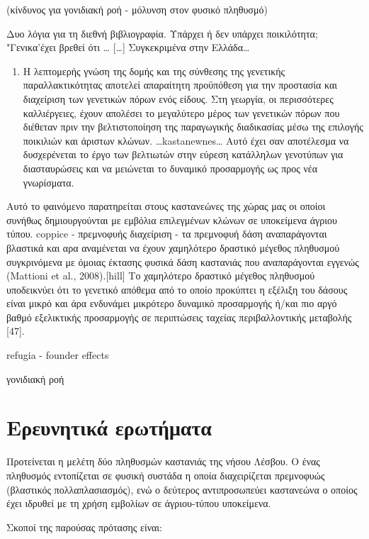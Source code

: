 \documentclass[12pt,a4paper,]{report}
\providecommand{\tightlist}{%
  \setlength{\itemsep}{0pt}\setlength{\parskip}{0pt}}
\begin{document}
(κίνδυνος για γονιδιακή ροή - μόλυνση στον φυσικό πληθυσμό)

Δυο λόγια για τη διεθνή βιβλιογραφία. Υπάρχει ή δεν υπάρχει ποικιλότητα;
"Γενικα'έχει βρεθεί ότι \ldots{} {[}\ldots{}{]} Συγκεκριμένα στην
Ελλάδα\ldots{}

\begin{enumerate}
\def\labelenumi{\arabic{enumi}.}
\tightlist
\item
  Η λεπτομερής γνώση της δομής και της σύνθεσης της γενετικής
  παραλλακτικότητας αποτελεί απαραίτητη προϋπόθεση για την προστασία και
  διαχείριση των γενετικών πόρων ενός είδους. Στη γεωργία, οι
  περισσότερες καλλιέργειες, έχουν απολέσει το μεγαλύτερο μέρος των
  γενετικών πόρων που διέθεταν πριν την βελτιστοποίηση της παραγωγικής
  διαδικασίας μέσω της επιλογής ποικιλιών και άριστων κλώνων.
  \ldots{}kastanewnes\ldots{} Αυτό έχει σαν αποτέλεσμα να δυσχερένεται
  το έργο των βελτιωτών στην εύρεση κατάλληλων γενοτύπων για
  διασταυρώσεις και να μειώνεται το δυναμικό προσαρμογής ως προς νέα
  γνωρίσματα.
\end{enumerate}

Αυτό το φαινόμενο παρατηρείται στους καστανεώνες της χώρας μας οι οποίοι
συνήθως δημιουργούνται με εμβόλια επιλεγμένων κλώνων σε υποκείμενα
άγριου τύπου. coppice - πρεμνοφυής διαχείριση - τα πρεμνοφυή δάση
αναπαράγονται βλαστικά και αρα αναμένεται να έχουν χαμηλότερο δραστικό
μέγεθος πληθυσμού συγκρινόμενα με όμοιας έκτασης φυσικά δάση καστανιάς
που αναπαράγονται εγγενώς (Mattioni et al., 2008).{[}hill{]} Το
χαμηλότερο δραστικό μέγεθος πληθυσμού υποδεικνύει ότι το γενετικό
απόθεμα από το οποίο προκύπτει η εξέλιξη του δάσους είναι μικρό και άρα
ενδυνάμει μικρότερο δυναμικό προσαρμογής ή/και πιο αργό βαθμό
εξελικτικής προσαρμογής σε περιπτώσεις ταχείας περιβαλλοντικής μεταβολής
{[}47{]}.

refugia - founder effects

γονιδιακή ροή

\hypertarget{-}{%
\section{Ερευνητικά ερωτήματα}\label{-}}

Προτείνεται η μελέτη δύο πληθυσμών καστανιάς της νήσου Λέσβου. Ο ένας
πληθυσμός εντοπίζεται σε φυσική συστάδα η οποία διαχειρίζεται πρεμνοφυώς
(βλαστικός πολλαπλασιασμός), ενώ ο δεύτερος αντιπροσωπεύει καστανεώνα ο
οποίος έχει ιδρυθεί με τη χρήση εμβολίων σε άγριου-τύπου υποκείμενα.

Σκοποί της παρούσας πρότασης είναι:
\end{document}
